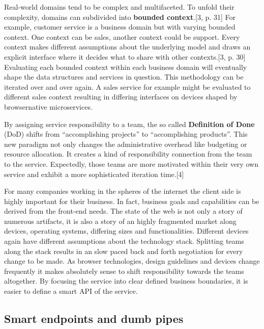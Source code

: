 \documentclass[]{article}
\begin{document}
Real-world domains tend to be complex and multifaceted. To unfold their
complexity, domains can subdivided into \textbf{bounded context}.{[}3,
p. 31{]} For example, customer service is a business domain but with
varying bounded context. One context can be sales, another context could
be support. Every context makes different assumptions about the
underlying model and draws an explicit interface where it decides what
to share with other contexts.{[}3, p. 30{]} Evaluating each bounded
context within each business domain will eventually shape the data
structures and services in question. This methodology can be iterated
over and over again. A sales service for example might be evaluated to
different sales context resulting in differing interfaces on devices
shaped by browsernative microservices.

By assigning service responsibility to a team, the so called
\textbf{Definition of Done} (DoD) shifts from ``accomplishing projects''
to ``accomplishing products''. This new paradigm not only changes the
administrative overhead like budgeting or resource allocation. It
creates a kind of responsibility connection from the team to the
service. Expectedly, those teams are more motivated within their very
own service and exhibit a more sophisticated iteration time.{[}4{]}

For many companies working in the spheres of the internet the client
side is highly important for their business. In fact, business goals and
capabilities can be derived from the front-end needs. The state of the
web is not only a story of numerous artifacts, it is also a story of an
highly fragmented market along devices, operating systems, differing
sizes and functionalities. Different devices again have different
assumptions about the technology stack. Splitting teams along the stack
results in an slow paced back and forth negotiation for every change to
be made. As browser technologies, design guidelines and devices change
frequently it makes absolutely sense to shift responsibility towards the
teams altogether. By focusing the service into clear defined business
boundaries, it is easier to define a smart API of the service.

\subsection{Smart endpoints and dumb
pipes}\label{smart-endpoints-and-dumb-pipes}
\end{document}
